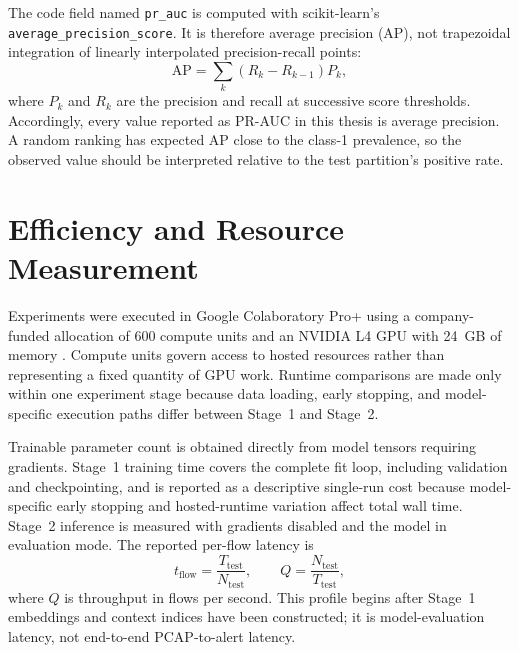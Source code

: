 \documentclass[11pt,fleqn]{report}
\begin{document}
The code field named \texttt{pr\_auc} is computed with scikit-learn's \texttt{average\_precision\_score}. It is therefore average precision (AP), not trapezoidal integration of linearly interpolated precision-recall points:
\begin{equation}
    \mathrm{AP}=\sum_{k}(R_k-R_{k-1})P_k,
    \label{eq:average_precision}
\end{equation}
where $P_k$ and $R_k$ are the precision and recall at successive score thresholds. Accordingly, every value reported as PR-AUC in this thesis is average precision. A random ranking has expected AP close to the class-1 prevalence, so the observed value should be interpreted relative to the test partition's positive rate.

\section{Efficiency and Resource Measurement}
\label{subsec:efficiency_protocol}

Experiments were executed in Google Colaboratory Pro+ using a company-funded allocation of 600 compute units and an NVIDIA L4 GPU with 24~GB of memory \cite{GoogleColabFAQ2026,NVIDIAL4ProductBrief}. Compute units govern access to hosted resources rather than representing a fixed quantity of GPU work. Runtime comparisons are made only within one experiment stage because data loading, early stopping, and model-specific execution paths differ between Stage~1 and Stage~2.

Trainable parameter count is obtained directly from model tensors requiring gradients. Stage~1 training time covers the complete fit loop, including validation and checkpointing, and is reported as a descriptive single-run cost because model-specific early stopping and hosted-runtime variation affect total wall time. Stage~2 inference is measured with gradients disabled and the model in evaluation mode. The reported per-flow latency is
\begin{equation}
    t_{\mathrm{flow}}=\frac{T_{\mathrm{test}}}{N_{\mathrm{test}}},
    \qquad
    Q=\frac{N_{\mathrm{test}}}{T_{\mathrm{test}}},
    \label{eq:inference_efficiency}
\end{equation}
where $Q$ is throughput in flows per second. This profile begins after Stage~1 embeddings and context indices have been constructed; it is model-evaluation latency, not end-to-end PCAP-to-alert latency.
\end{document}
